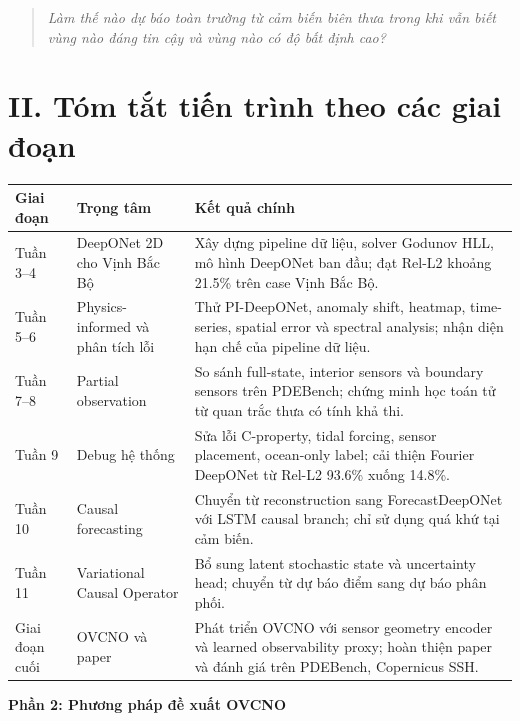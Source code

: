 \documentclass[a4paper, 12pt]{article}
\begin{document}
\begin{quote}
\textit{Làm thế nào dự báo toàn trường từ cảm biến biên thưa trong khi vẫn biết vùng nào đáng tin cậy và vùng nào có độ bất định cao?}
\end{quote}

\section*{II. Tóm tắt tiến trình theo các giai đoạn}

\begin{longtable}{p{2.4cm} p{4.2cm} p{7.2cm}}
\toprule
\textbf{Giai đoạn} & \textbf{Trọng tâm} & \textbf{Kết quả chính} \\
\midrule
Tuần 3--4 & DeepONet 2D cho Vịnh Bắc Bộ & Xây dựng pipeline dữ liệu, solver Godunov HLL, mô hình DeepONet ban đầu; đạt Rel-L2 khoảng 21.5\% trên case Vịnh Bắc Bộ. \\
Tuần 5--6 & Physics-informed và phân tích lỗi & Thử PI-DeepONet, anomaly shift, heatmap, time-series, spatial error và spectral analysis; nhận diện hạn chế của pipeline dữ liệu. \\
Tuần 7--8 & Partial observation & So sánh full-state, interior sensors và boundary sensors trên PDEBench; chứng minh học toán tử từ quan trắc thưa có tính khả thi. \\
Tuần 9 & Debug hệ thống & Sửa lỗi C-property, tidal forcing, sensor placement, ocean-only label; cải thiện Fourier DeepONet từ Rel-L2 93.6\% xuống 14.8\%. \\
Tuần 10 & Causal forecasting & Chuyển từ reconstruction sang ForecastDeepONet với LSTM causal branch; chỉ sử dụng quá khứ tại cảm biến. \\
Tuần 11 & Variational Causal Operator & Bổ sung latent stochastic state và uncertainty head; chuyển từ dự báo điểm sang dự báo phân phối. \\
Giai đoạn cuối & OVCNO và paper & Phát triển OVCNO với sensor geometry encoder và learned observability proxy; hoàn thiện paper và đánh giá trên PDEBench, Copernicus SSH. \\
\bottomrule
\end{longtable}

\begin{center}
{\huge\bfseries Phần 2: Phương pháp đề xuất OVCNO}
\end{center}
\end{document}
